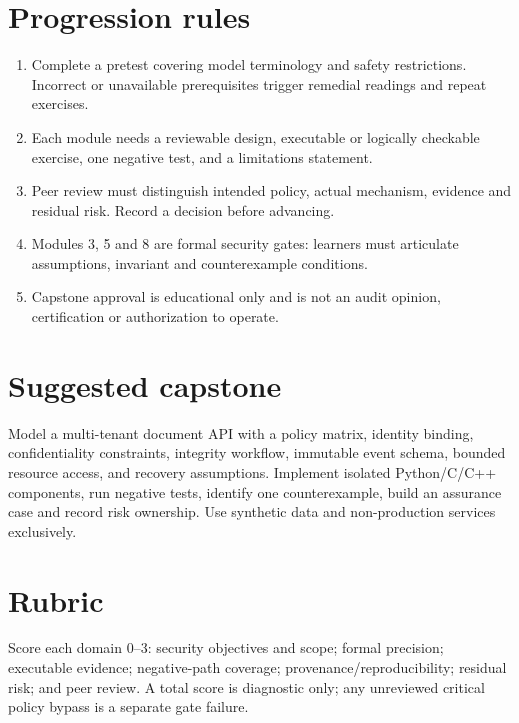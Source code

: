 \documentclass[10pt,letterpaper]{article}
\begin{document}
\section{Progression rules}
\begin{enumerate}
\item Complete a pretest covering model terminology and safety restrictions. Incorrect or unavailable prerequisites trigger remedial readings and repeat exercises.
\item Each module needs a reviewable design, executable or logically checkable exercise, one negative test, and a limitations statement.
\item Peer review must distinguish intended policy, actual mechanism, evidence and residual risk. Record a decision before advancing.
\item Modules 3, 5 and 8 are formal security gates: learners must articulate assumptions, invariant and counterexample conditions.
\item Capstone approval is educational only and is not an audit opinion, certification or authorization to operate.
\end{enumerate}
\section{Suggested capstone}
Model a multi-tenant document API with a policy matrix, identity binding, confidentiality constraints, integrity workflow, immutable event schema, bounded resource access, and recovery assumptions. Implement isolated Python/C/C++ components, run negative tests, identify one counterexample, build an assurance case and record risk ownership. Use synthetic data and non-production services exclusively.
\section{Rubric}
Score each domain 0--3: security objectives and scope; formal precision; executable evidence; negative-path coverage; provenance/reproducibility; residual risk; and peer review. A total score is diagnostic only; any unreviewed critical policy bypass is a separate gate failure.
\end{document}
